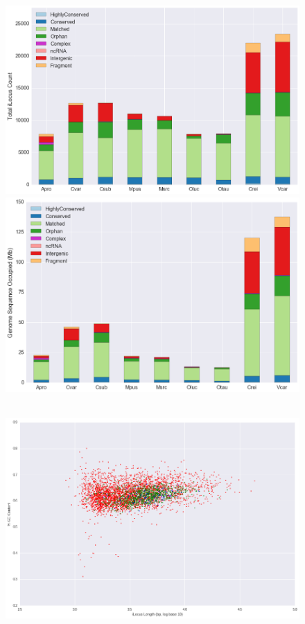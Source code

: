 \begin{figure}[h]
\centering
\includegraphics[width=6in]{Assets/Graphics/iLoci/algae-bd-counts.png} \par
\vspace{50px}
\includegraphics[width=6in]{Assets/Graphics/iLoci/algae-bd-bp.png}
\caption{~}
\label{Fig:GreenAlgaeBreakdown}
\end{figure}

\clearpage

\begin{figure}[h]
\includegraphics[width=6in]{Assets/Graphics/iLoci/crei-breakdown-scatter.png}
\centering
\caption{~}
\label{Fig:CreiBreakdownScatter}
\end{figure}

